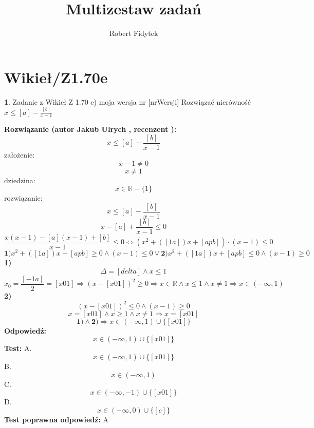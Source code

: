 \documentclass[12pt, a4paper]{article}
\title{Multizestaw zadań}
\author{Robert Fidytek}
\date{}
\theoremstyle{definition} %
\newtheorem{zad}{}
\newcommand{\kategoria}[1]{\section{#1}} %
\newcommand{\zadStart}[1]{\begin{zad}#1\newline} %
\newcommand{\zadStop}{\end{zad}}   %
\newcommand{\rozwStart}[2]{\noindent \textbf{Rozwiązanie (autor #1 , recenzent #2): }\newline} %
\newcommand{\rozwStop}{\newline}                                            %
\newcommand{\odpStart}{\noindent \textbf{Odpowiedź:}\newline}    %
\newcommand{\odpStop}{\newline}                                             %
\newcommand{\testStart}{\noindent \textbf{Test:}\newline} %
\newcommand{\testStop}{\newline} %
\newcommand{\kluczStart}{\noindent \textbf{Test poprawna odpowiedź:}\newline} %
\newcommand{\kluczStop}{\newline} %
\begin{document}
\maketitle


\kategoria{Wikieł/Z1.70e}
\zadStart{Zadanie z Wikieł Z 1.70 e) moja wersja nr [nrWersji]}
Rozwiązać nierówność $x\leq[a]-\frac{[b]}{x-1}$
\zadStop
\rozwStart{Jakub Ulrych}{}
$$x\leq[a]-\frac{[b]}{x-1}$$
założenie: $$x-1\neq0$$
$$x\neq1$$
dziedzina:$$x\in \mathbb{R}-\{1\}$$
rozwiązanie:$$x\leq[a]-\frac{[b]}{x-1}$$
$$x-[a]+\frac{[b]}{x-1}\leq0$$
$$\frac{x(x-1)-[a](x-1)+[b]}{x-1}\leq0\Leftrightarrow (x^{2}+([1a])x+[apb])\cdot(x-1)\leq0$$
$$\textbf{1)}x^{2}+([1a])x+[apb]\geq0 \land (x-1)\leq0 \vee \textbf{2)}x^{2}+([1a])x+[apb]\leq0 \land (x-1)\geq0$$
\textbf{1)}
$$\Delta=[delta] \land x\leq1$$
$$x_{0}=\frac{[-1a]}{2}=[x01]\Rightarrow(x-[x01])^{2}\geq0\Rightarrow x\in \mathbb{R} \land x\leq1 \land x\neq1\Rightarrow x\in(-\infty,1)$$
\textbf{2)}
$$(x-[x01])^{2}\leq0 \land (x-1)\geq0$$
$$x=[x01] \land x\geq1 \land x\neq1\Rightarrow x=[x01]$$
$$\textbf{1)}\land\textbf{2)}\Rightarrow x\in(-\infty,1)\cup\{[x01]\}$$
\rozwStop
\odpStart
$$x\in(-\infty,1)\cup\{[x01]\}$$
\odpStop
\testStart
A.$$x\in(-\infty,1)\cup\{[x01]\}$$
B.$$x\in(-\infty,1)$$
C.$$x\in(-\infty,-1)\cup\{[x01]\}$$
D.$$x\in(-\infty,0)\cup\{[c]\}$$
\testStop
\kluczStart
A
\kluczStop
\end{document}

